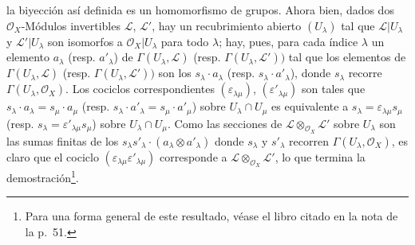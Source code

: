 \begin{env}[5.4.7]

la biyección así definida es un homomorfismo de grupos. Ahora bien, dados
dos $\mathcal{O}_X$-Módulos invertibles $\mathcal{L}$, $\mathcal{L}'$, hay
un recubrimiento abierto $(U_\lambda)$ tal que $\mathcal{L}|U_\lambda$ y
$\mathcal{L}'|U_\lambda$ son isomorfos a $\mathcal{O}_X|U_\lambda$ para
todo $\lambda$; hay, pues, para cada índice $\lambda$ un elemento
$a_\lambda$ (resp. $a'_\lambda$) de $\Gamma(U_\lambda,\mathcal{L})$ (resp.
$\Gamma(U_\lambda,\mathcal{L}'))$ tal que los elementos de
$\Gamma(U_\lambda,\mathcal{L})$ (resp. $\Gamma(U_\lambda,\mathcal{L}'))$
son los $s_\lambda\cdot a_\lambda$ (resp.
$s_\lambda\cdot a'_\lambda$), donde $s_\lambda$ recorre
$\Gamma(U_\lambda,\mathcal{O}_X)$. Los cociclos correspondientes
$(\varepsilon_{\lambda\mu})$, $(\varepsilon'_{\lambda\mu})$ son tales que
$s_\lambda\cdot a_\lambda=s_\mu\cdot a_\mu$ (resp.
$s_\lambda\cdot a'_\lambda=s_\mu\cdot a'_\mu$) sobre
$U_\lambda\cap U_\mu$ es equivalente a
$s_\lambda=\varepsilon_{\lambda\mu}s_\mu$ (resp.
$s_\lambda=\varepsilon'_{\lambda\mu}s_\mu$) sobre
$U_\lambda\cap U_\mu$. Como las secciones de
$\mathcal{L}\otimes_{\mathcal{O}_X}\mathcal{L}'$ sobre $U_\lambda$
son las sumas finitas de los
$s_\lambda s'_\lambda\cdot(a_\lambda\otimes a'_\lambda)$ donde $s_\lambda$ y
$s'_\lambda$ recorren $\Gamma(U_\lambda,\mathcal{O}_X)$, es claro que
el cociclo $(\varepsilon_{\lambda\mu}\varepsilon'_{\lambda\mu})$ corresponde
a $\mathcal{L}\otimes_{\mathcal{O}_X}\mathcal{L}'$, lo que termina la
demostración\footnote{Para una forma general de este resultado, véase el libro
citado en la nota de la p.~51.}.
\end{env}


